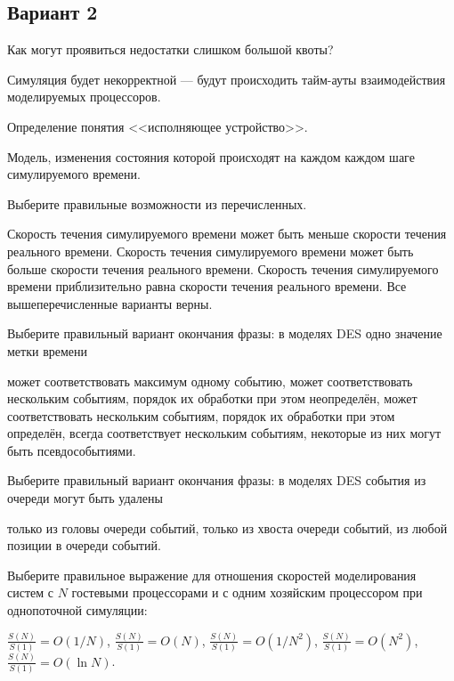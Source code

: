 \subsection*{Вариант 2}

\begin{questions}

\question[3] Как могут проявиться недостатки слишком большой квоты?
\begin{solution}[2cm]
    Симуляция будет некорректной --- будут происходить тайм-ауты взаимодействия моделируемых процессоров.
\end{solution}

\question[3] Определение понятия <<исполняющее устройство>>.
\begin{solution}[2cm]
Модель, изменения состояния которой происходят на каждом каждом шаге симулируемого времени.
\end{solution}

\question[3] Выберите правильные возможности из перечисленных.
\begin{choices}
    \choice Скорость течения симулируемого времени может быть меньше скорости течения реального времени.
    \choice Скорость течения симулируемого времени может быть больше скорости течения реального времени.
    \choice Скорость течения симулируемого времени приблизительно равна скорости течения реального времени.
    \correctchoice Все вышеперечисленные варианты верны.
\end{choices}   

\question[3] Выберите правильный вариант окончания фразы: в моделях DES одно значение метки времени
\begin{choices}
    \choice может соответствовать максимум одному событию,
    \choice может соответствовать нескольким событиям, порядок их обработки при этом неопределён,
    \correctchoice может соответствовать нескольким событиям, порядок их обработки при этом определён,
    \choice всегда соответствует нескольким событиям, некоторые из них могут быть псевдособытиями.
\end{choices}

\question[3] Выберите правильный вариант окончания фразы: в моделях DES события из очереди могут быть удалены
\begin{choices}
    \choice только из головы очереди событий,
    \choice только из хвоста очереди событий,
    \correctchoice из любой позиции в очереди событий.
\end{choices}

\question[3] Выберите правильное выражение для отношения скоростей моделирования систем с $N$ гостевыми процессорами и с одним хозяйским процессором при однопоточной симуляции:
\begin{choices}
    \correctchoice $\frac{S(N)}{S(1)} = O(1/N)$,
    \choice $\frac{S(N)}{S(1)} = O(N)$,
    \choice $\frac{S(N)}{S(1)} = O(1/N^2)$,
    \choice $\frac{S(N)}{S(1)} = O(N^2)$,
    \choice $\frac{S(N)}{S(1)} = O(\ln{}N)$.
\end{choices}


\end{questions}

